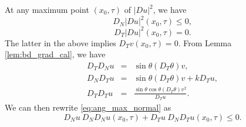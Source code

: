 \documentclass[12pt]{article}
\numberwithin{equation}{section}
\theoremstyle{plain}
\theoremstyle{definition}
\theoremstyle{remark}
\begin{document}
At any maximum point $(x_0,\tau)$ of $|Du|^2$, we have
\begin{equation} \label{eq:ang_max_normal}
    D_N |Du|^2(x_0,\tau) \leq 0,
\end{equation}
\begin{equation}
    D_T |Du|^2(x_0,\tau) = 0.
\end{equation}
The latter in the above implies $D_T v(x_0,\tau)=0$. From Lemma \ref{lem:bd_grad_cal}, we have
\begin{eqnarray} \label{eq:3.8}
D_T D_N u&=&\sin{\theta}(D_T \theta)v,\\
D_N D_T u&=&\sin{\theta}(D_T \theta)v+k D_T u,
\label{eq:3.9}\\
D_T D_T u&=&\frac{ \sin{\theta} \cos{\theta} (D_T \theta)v^2 }{D_T u}.
\label{eq:3.10}
\end{eqnarray}
We can then rewrite \eqref{eq:ang_max_normal} as
\begin{equation} \label{eq:ang_ineq1}
    D_N u \ D_N D_N u (x_0,\tau) + D_T u \ D_N D_T u (x_0,\tau) \leq 0.
\end{equation}
\end{document}
